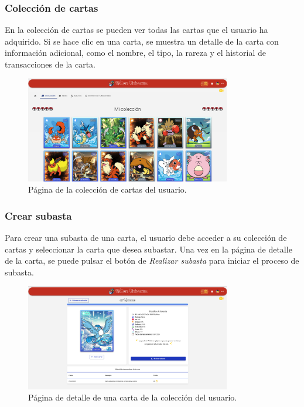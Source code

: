 \begin{enumerate}
\subsubsection{Colección de cartas}
En la colección de cartas se pueden ver todas las cartas que el usuario ha adquirido.
Si se hace clic en una carta, se muestra un detalle de la carta con información adicional, como el nombre, el tipo, la rareza y
el historial de transacciones de la carta.

\begin{figure}[H]
    \centering
    \includegraphics[width=0.8\textwidth]{figures/6-Analisis/6-Interfaz/interfaz/coleccion.png}
    \caption{Página de la colección de cartas del usuario.}
    \label{fig:m-interfaz-coleccion}
\end{figure}


\subsubsection{Crear subasta}
Para crear una subasta de una carta, el usuario debe acceder a su colección de cartas y seleccionar la carta que desea subastar.
Una vez en la página de detalle de la carta, se puede pulsar el botón de \textit{Realizar subasta} para iniciar el proceso de subasta.

\begin{figure}[H]
    \centering
    \includegraphics[width=0.8\textwidth]{figures/6-Analisis/6-Interfaz/interfaz/detalle_carta.png}
    \caption{Página de detalle de una carta de la colección del usuario.}
    \label{fig:m-interfaz-detalle-carta}
\end{figure}


\end{enumerate}
